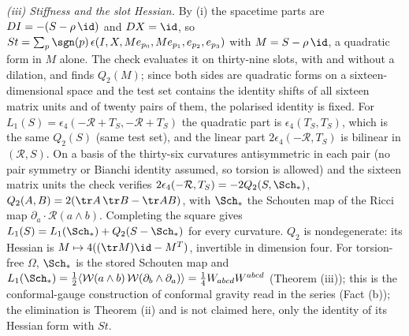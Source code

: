 \emph{(iii) Stiffness and the slot Hessian.} By (i) the spacetime parts are $DI = -(S - \rho\,\id)$ and $DX = \id$, so $St = \sum_{p}\sgn(p)\,\epsilon(I, X, M e_{p_{0}}, M e_{p_{1}}, e_{p_{2}}, e_{p_{3}})$ with $M = S - \rho\,\id$, a quadratic form in $M$ alone. The check evaluates it on thirty-nine slots, with and without a dilation, and finds $Q_{2}(M)$; since both sides are quadratic forms on a sixteen-dimensional space and the test set contains the identity shifts of all sixteen matrix units and of twenty pairs of them, the polarised identity is fixed. For $L_{1}(S) = \epsilon_{4}(-\mathcal{R} + T_{S}, -\mathcal{R} + T_{S})$ the quadratic part is $\epsilon_{4}(T_{S}, T_{S})$, which is the same $Q_{2}(S)$ (same test set), and the linear part $2\epsilon_{4}(-\mathcal{R}, T_{S})$ is bilinear in $(\mathcal{R}, S)$. On a basis of the thirty-six curvatures antisymmetric in each pair (no pair symmetry or Bianchi identity assumed, so torsion is allowed) and the sixteen matrix units the check verifies $2\epsilon_{4}(-\mathcal{R}, T_{S}) = -2Q_{2}(S, \Sch_{*})$, $Q_{2}(A, B) = 2(\tr A\,\tr B - \tr AB)$, with $\Sch_{*}$ the Schouten map of the Ricci map $\partial_{a} \cdot \mathcal{R}(a \wedge b)$. Completing the square gives $L_{1}(S) = L_{1}(\Sch_{*}) + Q_{2}(S - \Sch_{*})$ for every curvature. $Q_{2}$ is nondegenerate: its Hessian is $M \mapsto 4((\tr M)\id - M^{T})$, invertible in dimension four. For torsion-free $\Omega$, $\Sch_{*}$ is the stored Schouten map and $L_{1}(\Sch_{*}) = \tfrac12\langle\mathcal{W}(a \wedge b)\,\mathcal{W}(\partial_{b} \wedge \partial_{a})\rangle = \tfrac14 W_{abcd}W^{abcd}$ (Theorem (iii)); this is the conformal-gauge construction of conformal gravity read in the series (Fact (b)); the elimination is Theorem (ii) and is not claimed here, only the identity of its Hessian form with $St$.

